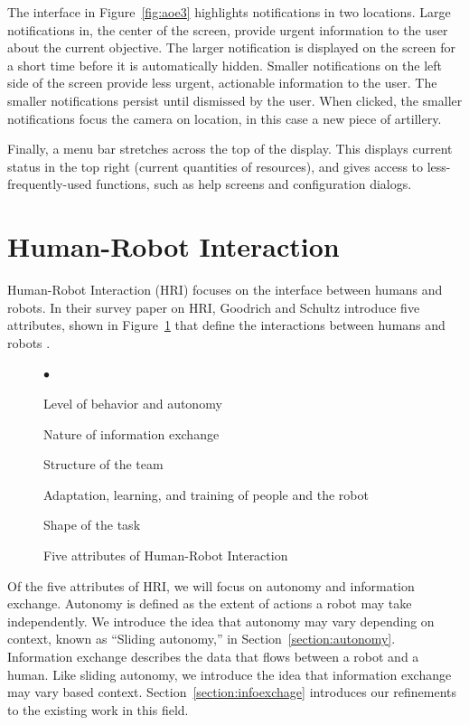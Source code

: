 The interface in Figure~\ref{fig:aoe3} highlights notifications in two locations. Large notifications in, the center of the screen, provide urgent information to the user about the current objective. The larger notification is displayed on the screen for a short time before it is automatically hidden. Smaller notifications on the left side of the screen provide less urgent, actionable information to the user. The smaller notifications persist until dismissed by the user. When clicked, the smaller notifications focus the camera on location, in this case a new piece of artillery.

Finally, a menu bar stretches across the top of the display. This displays current status in the top right (current quantities of resources), and gives access to less-frequently-used functions, such as help screens and configuration dialogs.



\section{Human-Robot Interaction}
\label{sec:hri}
Human-Robot Interaction (HRI) focuses on the interface between humans and robots. In their survey paper on HRI, Goodrich and Schultz introduce five attributes, shown in Figure~\ref{fig:five-attributes} that define the interactions between humans and robots \cite{Goodrich_Survey}.

\begin{figure}[ht]
	\makebox[\textwidth]{\hrulefill}
	\begin{list}{$\bullet$}
		\item Level of behavior and autonomy
		\item \item Nature of information exchange %
		\item Structure of the team
		\item Adaptation, learning, and training of people and the robot
		\item Shape of the task
	\end{list}
	\makebox[\textwidth]{\hrulefill}
	\caption{Five attributes of Human-Robot Interaction \label{fig:five-attributes}}
\end{figure}

Of the five attributes of HRI, we will focus on autonomy and information exchange. Autonomy is defined as the extent of actions a robot may take independently. We introduce the idea that autonomy may vary depending on context, known as ``Sliding autonomy,'' in Section~\ref{section:autonomy}. Information exchange describes the data that flows between a robot and a human. Like sliding autonomy, we introduce the idea that information exchange may vary based context. Section~\ref{section:infoexchage} introduces our refinements to the existing work in this field.

